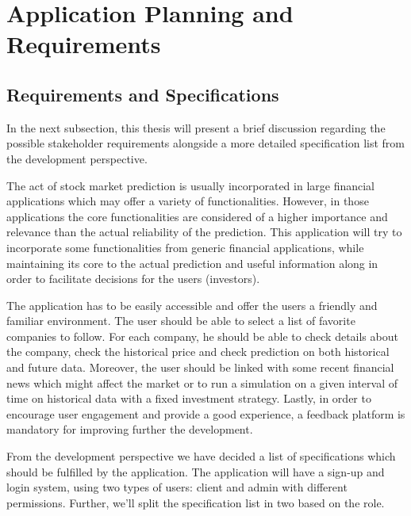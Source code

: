 \section{Application Planning and Requirements}
\subsection{Requirements and Specifications}
In the next subsection, this thesis will present a brief discussion regarding the possible stakeholder requirements alongside a more detailed specification list from the development perspective.

The act of stock market prediction is usually incorporated in large financial applications which may offer a variety of functionalities. However, in those applications the core functionalities are considered of a higher importance and relevance than the actual reliability of the prediction. This application will try to incorporate some functionalities from generic financial applications, while maintaining its core to the actual prediction and useful information along in order to facilitate decisions for the users (investors).

The application has to be easily accessible and offer the users a friendly and familiar environment. The user should be able to select a list of favorite companies to follow. For each company, he should be able to check details about the company, check the historical price and check prediction on both historical and future data. Moreover, the user should be linked with some recent financial news which might affect the market or to run a simulation on a given interval of time on historical data with a fixed investment strategy. Lastly, in order to encourage user engagement and provide a good experience, a feedback platform is mandatory for improving further the development. 

\vspace{5mm}

From the development perspective we have decided a list of specifications which should be fulfilled by the application. The application will have a sign-up and login system, using two types of users: client and admin with different permissions. Further, we'll split the specification list in two based on the role.

